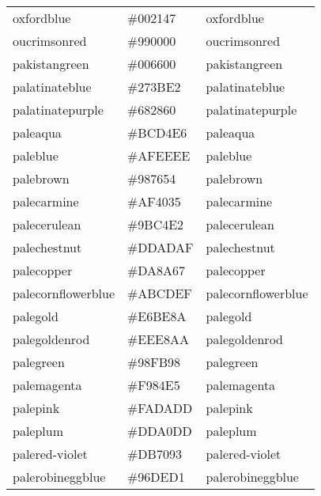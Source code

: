 \documentclass[
]{article}
\begin{document}
\begin{longtable}[]{@{}lll@{}}
oxfordblue & \colorbox[rgb]{0.0,0.13,0.28}{\#002147} &
\textcolor[rgb]{0.0,0.13,0.28}{oxfordblue            }\tabularnewline
oucrimsonred & \colorbox[rgb]{0.6,0.0,0.0}{\#990000} &
\textcolor[rgb]{0.6,0.0,0.0}{oucrimsonred          }\tabularnewline
pakistangreen & \colorbox[rgb]{0.0,0.4,0.0}{\#006600} &
\textcolor[rgb]{0.0,0.4,0.0}{pakistangreen         }\tabularnewline
palatinateblue & \colorbox[rgb]{0.15,0.23,0.89}{\#273BE2} &
\textcolor[rgb]{0.15,0.23,0.89}{palatinateblue        }\tabularnewline
palatinatepurple & \colorbox[rgb]{0.41,0.16,0.38}{\#682860} &
\textcolor[rgb]{0.41,0.16,0.38}{palatinatepurple      }\tabularnewline
paleaqua & \colorbox[rgb]{0.74,0.83,0.9}{\#BCD4E6} &
\textcolor[rgb]{0.74,0.83,0.9}{paleaqua              }\tabularnewline
paleblue & \colorbox[rgb]{0.69,0.93,0.93}{\#AFEEEE} &
\textcolor[rgb]{0.69,0.93,0.93}{paleblue              }\tabularnewline
palebrown & \colorbox[rgb]{0.6,0.46,0.33}{\#987654} &
\textcolor[rgb]{0.6,0.46,0.33}{palebrown             }\tabularnewline
palecarmine & \colorbox[rgb]{0.69,0.25,0.21}{\#AF4035} &
\textcolor[rgb]{0.69,0.25,0.21}{palecarmine           }\tabularnewline
palecerulean & \colorbox[rgb]{0.61,0.77,0.89}{\#9BC4E2} &
\textcolor[rgb]{0.61,0.77,0.89}{palecerulean          }\tabularnewline
palechestnut & \colorbox[rgb]{0.87,0.68,0.69}{\#DDADAF} &
\textcolor[rgb]{0.87,0.68,0.69}{palechestnut          }\tabularnewline
palecopper & \colorbox[rgb]{0.85,0.54,0.4}{\#DA8A67} &
\textcolor[rgb]{0.85,0.54,0.4}{palecopper            }\tabularnewline
palecornflowerblue & \colorbox[rgb]{0.67,0.8,0.94}{\#ABCDEF} &
\textcolor[rgb]{0.67,0.8,0.94}{palecornflowerblue    }\tabularnewline
palegold & \colorbox[rgb]{0.9,0.75,0.54}{\#E6BE8A} &
\textcolor[rgb]{0.9,0.75,0.54}{palegold              }\tabularnewline
palegoldenrod & \colorbox[rgb]{0.93,0.91,0.67}{\#EEE8AA} &
\textcolor[rgb]{0.93,0.91,0.67}{palegoldenrod         }\tabularnewline
palegreen & \colorbox[rgb]{0.6,0.98,0.6}{\#98FB98} &
\textcolor[rgb]{0.6,0.98,0.6}{palegreen             }\tabularnewline
palemagenta & \colorbox[rgb]{0.98,0.52,0.9}{\#F984E5} &
\textcolor[rgb]{0.98,0.52,0.9}{palemagenta           }\tabularnewline
palepink & \colorbox[rgb]{0.98,0.85,0.87}{\#FADADD} &
\textcolor[rgb]{0.98,0.85,0.87}{palepink              }\tabularnewline
paleplum & \colorbox[rgb]{0.8,0.6,0.8}{\#DDA0DD} &
\textcolor[rgb]{0.8,0.6,0.8}{paleplum              }\tabularnewline
palered-violet & \colorbox[rgb]{0.86,0.44,0.58}{\#DB7093} &
\textcolor[rgb]{0.86,0.44,0.58}{palered-violet        }\tabularnewline
palerobineggblue & \colorbox[rgb]{0.59,0.87,0.82}{\#96DED1} &
\textcolor[rgb]{0.59,0.87,0.82}{palerobineggblue      }\tabularnewline

\end{longtable}
\end{document}
